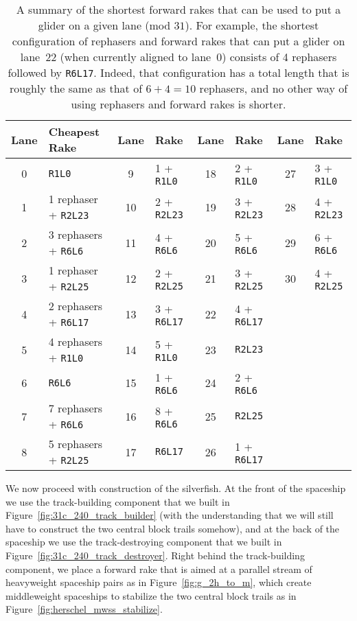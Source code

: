 \begin{table}[!htbp]
	\centering
	\begin{tabular}{c l | c l | c l | c l}
		\toprule
		Lane & Cheapest Rake & Lane & Rake & Lane & Rake & Lane & Rake \\ \midrule
		0 & \texttt{R1L0} & 9 & 1 + \texttt{R1L0} & 18 & 2 + \texttt{R1L0} & 27 & 3 + \texttt{R1L0} \\
		1 & 1 rephaser + \texttt{R2L23} & 10 & 2 + \texttt{R2L23} & 19 & 3 + \texttt{R2L23} & 28 & 4 + \texttt{R2L23}\\
		2 & 3 rephasers + \texttt{R6L6} & 11 & 4 + \texttt{R6L6} & 20 & 5 + \texttt{R6L6} & 29 & 6 + \texttt{R6L6} \\
		3 & 1 rephaser + \texttt{R2L25} & 12 & 2 + \texttt{R2L25} & 21 & 3 + \texttt{R2L25} & 30 & 4 + \texttt{R2L25} \\
		4 & 2 rephasers + \texttt{R6L17} & 13 & 3 + \texttt{R6L17} & 22 & 4 + \texttt{R6L17} & & \\
		5 & 4 rephasers + \texttt{R1L0} & 14 & 5 + \texttt{R1L0} & 23 & \texttt{R2L23} & & \\
		6 & \texttt{R6L6} & 15 & 1 + \texttt{R6L6} & 24 & 2 + \texttt{R6L6} & & \\
		7 & 7 rephasers + \texttt{R6L6} & 16 & 8 + \texttt{R6L6} & 25 & \texttt{R2L25} & & \\
		8 & 5 rephasers + \texttt{R2L25} & 17 & \texttt{R6L17} & 26 & 1 + \texttt{R6L17} & & \\
		\bottomrule
	\end{tabular}
	\caption{A summary of the shortest forward rakes that can be used to put a glider on a given lane (mod $31$). For example, the shortest configuration of rephasers and forward rakes that can put a glider on lane~22 (when currently aligned to lane~0) consists of 4 rephasers followed by \texttt{R6L17}. Indeed, that configuration has a total length that is roughly the same as that of $6 + 4 = 10$ rephasers, and no other way of using rephasers and forward rakes is shorter.}\label{tab:silverfish_forward_rakes}
\end{table}

We now proceed with construction of the silverfish. At the front of the spaceship we use the track-building component that we built in Figure~\ref{fig:31c_240_track_builder} (with the understanding that we will still have to construct the two central block trails somehow), and at the back of the spaceship we use the track-destroying component that we built in Figure~\ref{fig:31c_240_track_destroyer}. Right behind the track-building component, we place a forward rake that is aimed at a parallel stream of heavyweight spaceship pairs as in Figure~\ref{fig:g_2h_to_m}, which create middleweight spaceships to stabilize the two central block trails as in Figure~\ref{fig:herschel_mwss_stabilize}.

